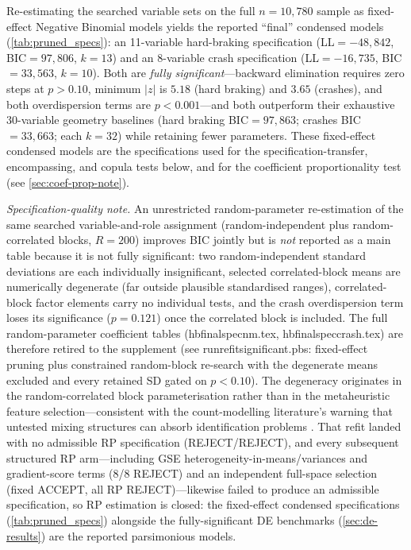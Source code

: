 \documentclass[letterpaper,8pt]{extarticle}  %
\newcommand{\file}[1]{{\ttfamily\def\_{\textunderscore\allowbreak}#1}}
\begin{document}
\begin{doublespacing}
\begin{linenumbers}
Re-estimating the searched variable sets on the full $n=10{,}780$ sample as fixed-effect Negative Binomial models yields the reported ``final'' condensed models (\cref{tab:pruned_specs}): an 11-variable hard-braking specification (LL$=-48{,}842$, BIC$=97{,}806$, $k=13$) and an 8-variable crash specification (LL$=-16{,}735$, BIC$=33{,}563$, $k=10$). Both are \emph{fully significant}---backward elimination requires zero steps at $p>0.10$, minimum $|z|$ is $5.18$ (hard braking) and $3.65$ (crashes), and both overdispersion terms are $p<0.001$---and both outperform their exhaustive 30-variable geometry baselines (hard braking BIC$=97{,}863$; crashes BIC$=33{,}663$; each $k=32$) while retaining fewer parameters. These fixed-effect condensed models are the specifications used for the specification-transfer, encompassing, and copula tests below, and for the coefficient proportionality test (see \cref{sec:coef-prop-note}).



\FloatBarrier

\emph{Specification-quality note.} An unrestricted random-parameter re-estimation of the same searched variable-and-role assignment (random-independent plus random-correlated blocks, $R=200$) improves BIC jointly but is \emph{not} reported as a main table because it is not fully significant: two random-independent standard deviations are each individually insignificant, selected correlated-block means are numerically degenerate (far outside plausible standardised ranges), correlated-block factor elements carry no individual tests, and the crash overdispersion term loses its significance ($p=0.121$) once the correlated block is included. The full random-parameter coefficient tables (\file{hb\_final\_spec\_nm.tex}, \file{hb\_final\_spec\_crash.tex}) are therefore retired to the supplement (see \file{run\_refit\_significant.pbs}: fixed-effect pruning plus constrained random-block re-search with the degenerate means excluded and every retained SD gated on $p<0.10$). The degeneracy originates in the random-correlated block parameterisation rather than in the metaheuristic feature selection---consistent with the count-modelling literature's warning that untested mixing structures can absorb identification problems \citep{LordMannering2010StatisticalAnalysis,Mannering2016UnobservedHeterogeneity}. That refit landed with no admissible RP specification (REJECT/REJECT), and every subsequent structured RP arm---including GSE heterogeneity-in-means/variances and gradient-score terms (8/8 REJECT) and an independent full-space selection (fixed ACCEPT, all RP REJECT)---likewise failed to produce an admissible specification, so RP estimation is closed: the fixed-effect condensed specifications (\cref{tab:pruned_specs}) alongside the fully-significant DE benchmarks (\cref{sec:de-results}) are the reported parsimonious models.


\end{linenumbers}
\end{doublespacing}
\end{document}
